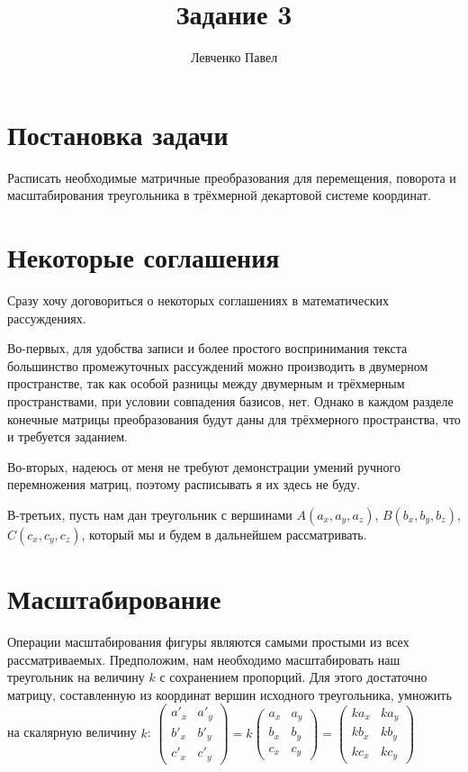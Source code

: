 \documentclass [12pt, a4paper] {article}
\title {Задание 3}
\author {Левченко Павел}
\begin{document}
\section {Постановка задачи}
Расписать необходимые матричные преобразования для перемещения, поворота и масштабирования треугольника в трёхмерной декартовой системе координат.

\section {Некоторые соглашения}
Сразу хочу договориться о некоторых соглашениях в математических рассуждениях.

Во-первых, для удобства записи и более простого воспринимания текста большинство промежуточных рассуждений можно производить в двумерном пространстве, так как особой разницы между двумерным и трёхмерным пространствами, при условии совпадения базисов, нет. Однако в каждом разделе конечные матрицы преобразования будут даны для трёхмерного пространства, что и требуется заданием.

Во-вторых, надеюсь от меня не требуют демонстрации умений ручного перемножения матриц, поэтому расписывать я их здесь не буду.

В-третьих, пусть нам дан треугольник с вершинами $A(a_x, a_y, a_z)$, $B(b_x, b_y, b_z)$, $C(c_x, c_y, c_z)$, который мы и будем в дальнейшем рассматривать.

\section {Масштабирование}
Операции масштабирования фигуры являются самыми простыми из всех рассматриваемых. Предположим, нам необходимо масштабировать наш треугольник на величину $k$ с сохранением пропорций.
Для этого достаточно матрицу, составленную из координат вершин исходного треугольника, умножить на скалярную величину $k$:
$\begin {pmatrix}
	a'_x & a'_y \\
	b'_x & b'_y \\
	c'_x & c'_y
\end {pmatrix} = k \begin {pmatrix}
	a_x & a_y \\
	b_x & b_y \\
	c_x & c_y
\end {pmatrix} = \begin {pmatrix}
	ka_x & ka_y \\
	kb_x & kb_y \\
	kc_x & kc_y
\end {pmatrix}$
\end{document}

